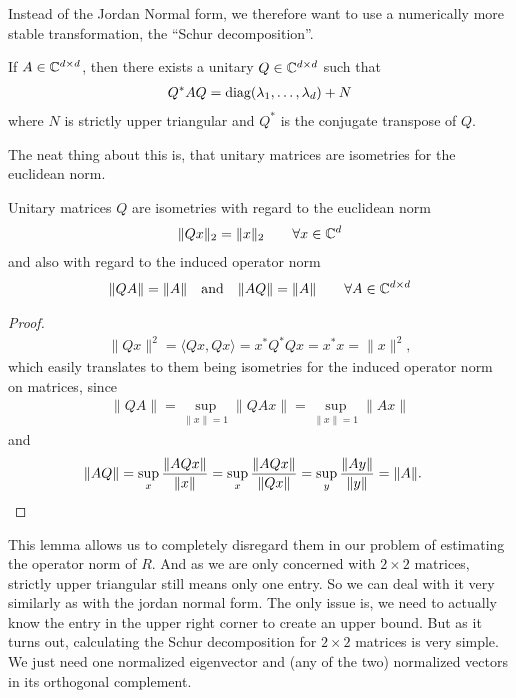 Instead of the Jordan Normal form, we therefore want to use a numerically more
stable transformation, the ``Schur decomposition''.

\begin{theorem}
	If \(A\in\mathbb{C}^{d\times d}\), then there exists a unitary
	\(Q\in\mathbb{C}^{d\times d}\) such that
	\begin{align*}
		Q^* A Q = \text{diag}(\lambda_1, \dots, \lambda_d) + N
	\end{align*}
	where \(N\) is strictly upper triangular and \(Q^*\) is the conjugate
	transpose of \(Q\).
\end{theorem}

The neat thing about this is, that unitary matrices are isometries for the
euclidean norm.

\begin{lemma}
	\label{lem: unitary matrices are isometries}
	Unitary matrices \(Q\) are isometries with regard to the euclidean norm
	\begin{align*}
		\|Qx\|_2 = \|x\|_2 \qquad \forall x\in\mathbb{C}^d
	\end{align*}	
	and also with regard to the induced operator norm
	\begin{align*}
		\|QA\| = \|A\| \quad \text{and} \quad \|AQ\| = \|A\|
		\qquad \forall A \in\mathbb{C}^{d\times d}
	\end{align*}
\end{lemma}
\begin{proof}
	\begin{align*}
		\|Qx\|^2 = \langle Qx, Qx\rangle = x^* Q^* Q x = x^* x = \|x\|^2,
	\end{align*}
	which easily translates to them being isometries for the induced operator norm
	on matrices, since
	\begin{align*}
		\|QA\| = \sup_{\|x\|=1} \|QAx\| = \sup_{\|x\|=1} \|Ax\|
	\end{align*}
	and
	\begin{align*}
		\|AQ\|
		&= \sup_{x} \frac{\|AQx\|}{\|x\|} = \sup_{x} \frac{\|AQx\|}{\|Qx\|}
		= \sup_{y} \frac{\|Ay\|}{\|y\|} = \|A\|.
		\qedhere
	\end{align*}
\end{proof}

This lemma allows us to completely disregard them in our problem of estimating
the operator norm of \(R\). And as we are only concerned with \(2\times 2\)
matrices, strictly upper triangular still means only one entry. So we can deal
with it very similarly as with the jordan normal form. The only issue is, we
need to actually know the entry in the upper right corner to create an upper
bound. But as it turns out, calculating the Schur decomposition for \(2\times 2\)
matrices is very simple. We just need one normalized eigenvector and (any of the
two) normalized vectors in its orthogonal complement.

